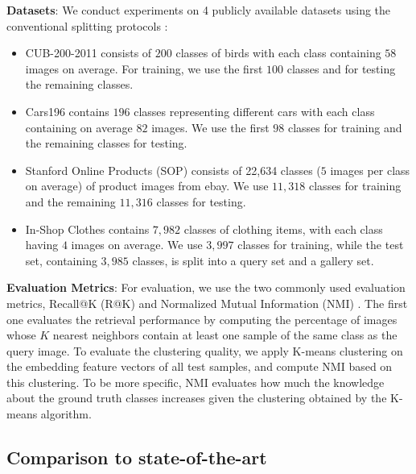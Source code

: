 \documentclass{article}
\begin{document}
\textbf{Datasets}: We conduct experiments on 4 publicly available datasets using the conventional splitting protocols \cite{DBLP:conf/cvpr/SongXJS16}:
\begin{itemize}
\item
CUB-200-2011 \cite{WahCUB_200_2011} consists of $200$ classes of birds with each class containing $58$ images on average. For training, we use the first $100$ classes and for testing the remaining classes.
\item
Cars196 \cite{KrauseStarkDengFei-Fei_3DRR2013} contains $196$ classes representing different cars with each class containing on average $82$ images. We use the first $98$ classes for training and the remaining classes for testing.
\item
Stanford Online Products (SOP) \cite{DBLP:conf/cvpr/SongXJS16} consists of 22,634 classes  ($5$ images per class on average) of product images from ebay. We use $11,318$ classes for training and the remaining $11,316$ classes for testing. 
\item
In-Shop Clothes \cite{DBLP:conf/cvpr/LiuLQWT16} contains $7,982$ classes of clothing items, with each class having $4$ images on average. We use $3,997$ classes for training, while the test set, containing $3,985$ classes, is split into a query set and a gallery set.
\end{itemize}


\textbf{Evaluation Metrics}: For evaluation, we use the two commonly used evaluation metrics, Recall@K (R@K) \cite{DBLP:journals/pami/JegouDS11} and Normalized Mutual Information (NMI) \cite{DBLP:journals/corr/abs-1110-2515}. The first one evaluates the retrieval performance by computing the percentage of images whose $K$ nearest neighbors contain at least one sample of the same class as the query image. To evaluate the clustering quality, we apply K-means clustering \cite{MacQueen} on the embedding feature vectors of all test samples, and compute NMI based on this clustering. To be more specific, NMI evaluates how much the knowledge about the ground truth classes increases given the clustering obtained by the K-means algorithm. 



\subsection{Comparison to state-of-the-art}
\label{subsec:ComparisonSOTA}
\end{document}
